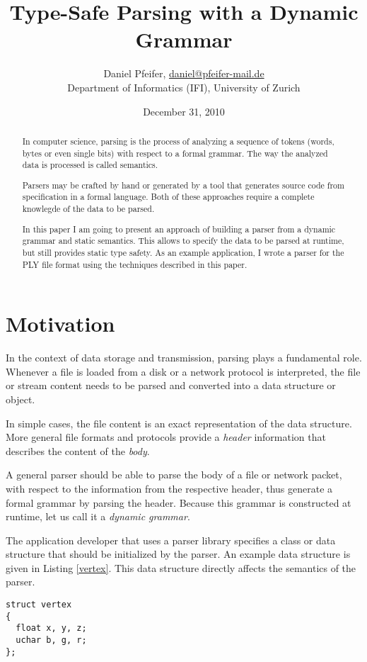 \documentclass[a4paper,parskip=half,twocolumn]{scrartcl}
\title{Type-Safe Parsing with a Dynamic Grammar}
\author{Daniel Pfeifer,
\href{mailto:daniel@pfeifer-mail.de}{daniel@pfeifer-mail.de} \\
Department of Informatics (IFI), University of Zurich}
\date{December 31, 2010}
\begin{document}
\maketitle

\begin{abstract}
In computer science, parsing is the process of analyzing a sequence of tokens
(words, bytes or even single bits) with respect to a formal grammar. The way
the analyzed data is processed is called semantics.

Parsers may be crafted by hand or generated by a tool that generates source code
from specification in a formal language. Both of these approaches require a
complete knowlegde of the data to be parsed.

In this paper I am going to present an approach of building a parser from a
dynamic grammar and static semantics. This allows to specify the data to be
parsed at runtime, but still provides static type safety. As an example
application, I wrote a parser for the PLY file format using the techniques
described in this paper.
\end{abstract}

\section{Motivation}
In the context of data storage and transmission, parsing plays a fundamental
role. Whenever a file is loaded from a disk or a network protocol is
interpreted, the file or stream content needs to be parsed and converted into a
data structure or object.

In simple cases, the file content is an exact representation of the data
structure. More general file formats and protocols provide a \emph{header}
information that describes the content of the \emph{body}.

A general parser should be able to parse the body of a file or network packet,
with respect to the information from the respective header, thus generate a
formal grammar by parsing the header. Because this grammar is constructed at
runtime, let us call it a \emph{dynamic grammar}.

The application developer that uses a parser library specifies a class or data
structure that should be initialized by the parser. An example data structure is
given in Listing \ref{vertex}. This data structure directly affects the
semantics of the parser.

\begin{lstlisting}[frame=tb,label=vertex,caption=Vertex Example]
struct vertex
{
  float x, y, z;
  uchar b, g, r;
};
\end{lstlisting}
\end{document}
